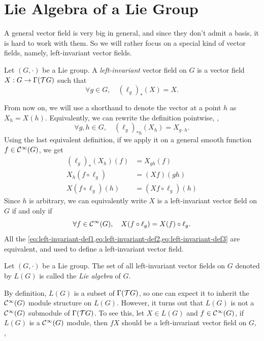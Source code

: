 \section{Lie Algebra of a Lie Group}

A general vector field is very big in general, and since they don't admit a basis, it is hard to work with them. So we will rather focus on a special kind of vector fields, namely, left-invariant vector fields.
\begin{definition}
    Let \((G, \cdot)\) be a Lie group. A \emph{left-invariant} vector field on \(G\) is a vector field \(X: G \to \Gamma(\mathcal T G)\) such that
    \begin{equation} \label{eq:left-invariant-def1}
        \forall g \in G, \quad (\ell_g)_*(X) = X.
    \end{equation}
\end{definition}
From now on, we will use a shorthand to denote the vector at a point \(h\) as \(X_h = X(h)\). Equivalently, we can rewrite the definition pointwise, \ie,
\begin{equation} \label{eq:left-invariant-def2}
    \forall g, h \in G, \quad (\ell_g)_{* h}(X_h) = X_{g \cdot h}.
\end{equation}
Using the last equivalent definition, if we apply it on a general smooth function \(f \in \mathcal C^\infty(G)\), we get
\begin{align*}
    (\ell_g)_*(X_h)(f)   & = X_{g h}(f)            \\
    X_h(f \circ \ell_g)  & = (X f)(g h)            \\
    X(f \circ \ell_g)(h) & = (X f \circ \ell_g)(h)
\end{align*}
Since \(h\) is arbitrary, we can equivalently write \(X\) is a left-invariant vector field on \(G\) if and only if
\begin{equation} \label{eq:left-invariant-def3}
    \forall f \in \mathcal C^\infty(G), \quad X(f \circ \ell_g) = X(f) \circ \ell_g.
\end{equation}
All the \cref{eq:left-invariant-def1,eq:left-invariant-def2,eq:left-invariant-def3} are equivalent, and used to define a left-invariant vector field.
\begin{definition}
    Let \((G, \cdot)\) be a Lie group. The set of all left-invariant vector fields on \(G\) denoted by \(L(G)\) is called the \emph{Lie algebra} of \(G\).
\end{definition}
By definition, \(L(G)\) is a subset of \(\Gamma(\mathcal T G)\), so one can expect it to inherit the \(\mathcal C^\infty(G)\) module structure on \(L(G)\). However, it turns out that \(L(G)\) is not a \(\mathcal C^\infty(G)\) submodule of \(\Gamma(\mathcal T G)\). To see this, let \(X \in L(G)\) and \(f \in \mathcal C^\infty(G)\), if \(L(G)\) is a \(\mathcal C^\infty(G)\) module, then \(f X\) should be a left-invariant vector field on \(G\), \ie,
